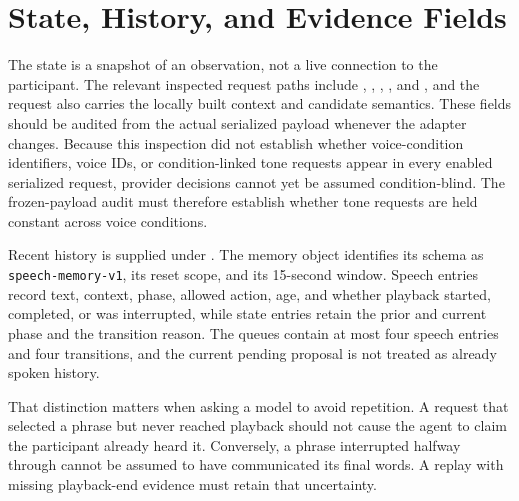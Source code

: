 \section{State, History, and Evidence Fields}
The state is a snapshot of an observation, not a live connection to the participant. The relevant inspected request paths include , , , , and , and the request also carries the locally built context and candidate semantics. These fields should be audited from the actual serialized payload whenever the adapter changes. Because this inspection did not establish whether voice-condition identifiers, voice IDs, or condition-linked tone requests appear in every enabled serialized request, provider decisions cannot yet be assumed condition-blind. The frozen-payload audit must therefore establish whether tone requests are held constant across voice conditions.

Recent history is supplied under . The memory object identifies its schema as \texttt{speech-memory-v1}, its reset scope, and its 15-second window. Speech entries record text, context, phase, allowed action, age, and whether playback started, completed, or was interrupted, while state entries retain the prior and current phase and the transition reason. The queues contain at most four speech entries and four transitions, and the current pending proposal is not treated as already spoken history.

That distinction matters when asking a model to avoid repetition. A request that selected a phrase but never reached playback should not cause the agent to claim the participant already heard it. Conversely, a phrase interrupted halfway through cannot be assumed to have communicated its final words. A replay with missing playback-end evidence must retain that uncertainty.

